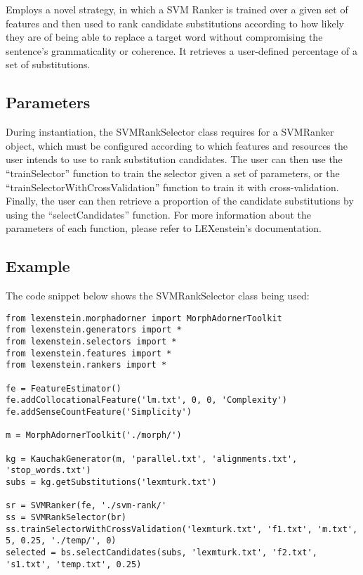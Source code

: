 Employs a novel strategy, in which a SVM Ranker is trained over a given set of features and then used to rank candidate substitutions according to how likely they are of being able to replace a target word without compromising the sentence's grammaticality or coherence. It retrieves a user-defined percentage of a set of substitutions.

\subsection{Parameters}

During instantiation, the SVMRankSelector class requires for a SVMRanker object, which must be configured according to which features and resources the user intends to use to rank substitution candidates. The user can then use the ``trainSelector'' function to train the selector given a set of parameters, or the ``trainSelectorWithCrossValidation'' function to train it with cross-validation. Finally, the user can then retrieve a proportion of the candidate substitutions by using the ``selectCandidates'' function. For more information about the parameters of each function, please refer to LEXenstein's documentation.

\subsection{Example}

The code snippet below shows the SVMRankSelector class being used:

\begin{lstlisting}
from lexenstein.morphadorner import MorphAdornerToolkit
from lexenstein.generators import *
from lexenstein.selectors import *
from lexenstein.features import *
from lexenstein.rankers import *

fe = FeatureEstimator()
fe.addCollocationalFeature('lm.txt', 0, 0, 'Complexity')
fe.addSenseCountFeature('Simplicity')

m = MorphAdornerToolkit('./morph/')

kg = KauchakGenerator(m, 'parallel.txt', 'alignments.txt', 'stop_words.txt')
subs = kg.getSubstitutions('lexmturk.txt')

sr = SVMRanker(fe, './svm-rank/'
ss = SVMRankSelector(br)
ss.trainSelectorWithCrossValidation('lexmturk.txt', 'f1.txt', 'm.txt', 5, 0.25, './temp/', 0)
selected = bs.selectCandidates(subs, 'lexmturk.txt', 'f2.txt', 's1.txt', 'temp.txt', 0.25)
\end{lstlisting}










